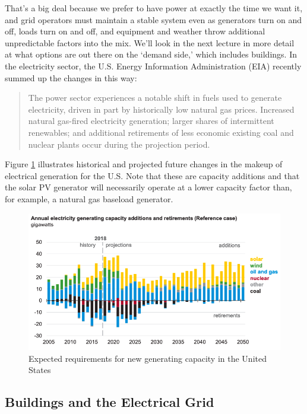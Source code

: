 \documentclass[10pt]{article}
\begin{document}
That's a big deal because we prefer to have power at exactly the time we want it, and grid operators must maintain a stable system even as generators turn on and off, loads turn on and off, and equipment and weather throw additional unpredictable factors into the mix. We'll look in the next lecture in more detail at what options are out there on the `demand side,' which includes buildings. In the electricity sector, the U.S. Energy Information Administration (EIA) recently summed up the changes in this way:

\begin{quote}
    The power sector experiences a notable shift in fuels used to generate electricity, driven in part by
historically low natural gas prices. Increased natural gas-fired electricity generation; larger shares of
intermittent renewables; and additional retirements of less economic existing coal and nuclear plants
occur during the projection period. \cite{aeo2019}
\end{quote}

Figure \ref{USgen} illustrates historical and projected future changes in the makeup of electrical generation for the U.S. Note that these are capacity additions and that the solar PV generator will necessarily operate at a lower capacity factor than, for example, a natural gas baseload generator.

            \begin{figure}[h]
            \centering
            \includegraphics[width=13cm]{extras28/annelec.png}
            \caption{Expected requirements for new generating capacity in the United States \cite{aeo2019}}
            \label{USgen}
            \end{figure}

\subsection{Buildings and the Electrical Grid}
\end{document}
